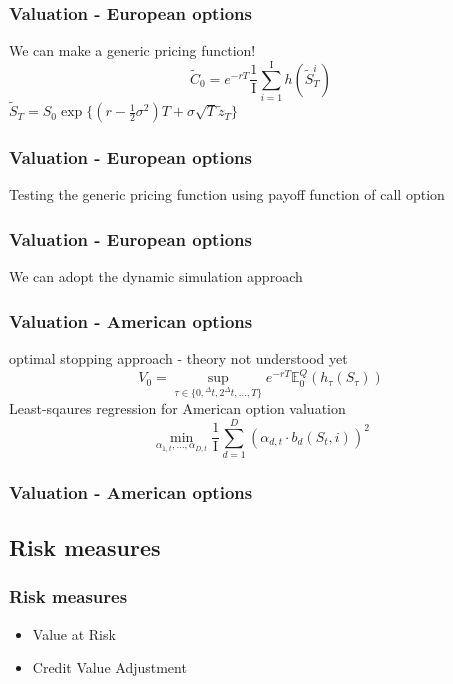 \documentclass{beamer}
\begin{document}
\begin{frame}
\frametitle{Valuation - European options}
\begin{center}
We can make a generic pricing function!
$$\tilde{C}_{0} = e^{-rT} \frac{1}{\mathrm{I}} \sum_{i=1}^{\mathrm{I}} h({\tilde{S}}_{T}^{i}) $$
$\tilde{S}_{T} = S_{0}\exp\{(r-\frac{1}{2}\sigma^{2})T + \sigma\sqrt{T}\tilde{z}_{T}\}$
\end{center}
\end{frame}

\begin{frame}
\frametitle{Valuation - European options}
\begin{center}
Testing the generic pricing function using payoff function of call option\\[3mm]
\end{center}
\end{frame}

\begin{frame}
\frametitle{Valuation - European options}
\begin{center}
We can adopt the dynamic simulation approach
\end{center}
\end{frame}

\begin{frame}
\frametitle{Valuation - American options}
\begin{center}
optimal stopping approach - theory not understood yet
$$V_{0} = \sup_{\tau \in \{ 0, {^{\Delta}t}, 2{^{\Delta}t}, \dots, T \}} e^{-rT} \mathbb{E}_{0}^{Q}(h_{\tau}(S_{\tau}))$$
Least-sqaures regression for American option valuation
$$ \min_{\alpha_{1,t}, \dots, \alpha_{D,t}} \frac{1}{\mathrm{I}} \sum_{d=1}^{D} (\alpha_{d,t}\cdot b_{d}(S_{t}, i))^{2} $$
\end{center}
\end{frame}

\begin{frame}
\frametitle{Valuation - American options}
\end{frame}

\subsection{Risk measures}
\begin{frame}
\frametitle{Risk measures}
\begin{itemize}
	\item Value at Risk
	\item Credit Value Adjustment
\end{itemize}
\end{frame}
\end{document}

